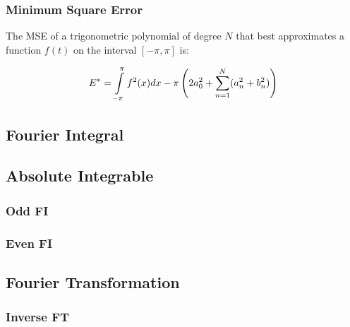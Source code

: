 \subsubsection{Minimum Square Error}
The MSE of a trigonometric polynomial of degree $N$ that best approximates a function $f(t)$ on the interval $[-\pi,\pi]$ is: 

\begin{align*}
    E^*=\intop_{-\pi}^\pi f^2(x)dx-\pi\left(2a_0^2+\sum_{n=1}^N(a_n^2+b_n^2)\right)
\end{align*}

\subsection{Fourier Integral}
\subsection{Absolute Integrable}
\subsubsection{Odd FI}
\subsubsection{Even FI}
\subsection{Fourier Transformation}
\subsubsection{Inverse FT}
